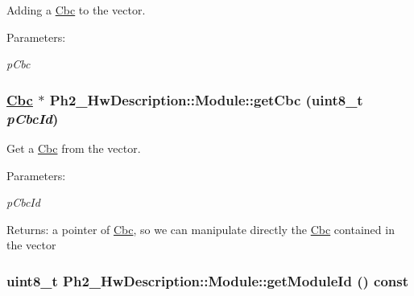 Adding a \hyperlink{class_ph2___hw_description_1_1_cbc}{Cbc} to the vector. 

\begin{Desc}
\item[Parameters:]
\begin{description}
\item[{\em p\-Cbc}]\end{description}
\end{Desc}
\hypertarget{class_ph2___hw_description_1_1_module_05ccbee9ca3eb8022e359b5e9dabe783}{
\subsubsection[getCbc]{\setlength{\rightskip}{0pt plus 5cm}\hyperlink{class_ph2___hw_description_1_1_cbc}{Cbc} $\ast$ Ph2\_\-Hw\-Description::Module::get\-Cbc (uint8\_\-t {\em p\-Cbc\-Id})}}
\label{class_ph2___hw_description_1_1_module_05ccbee9ca3eb8022e359b5e9dabe783}


Get a \hyperlink{class_ph2___hw_description_1_1_cbc}{Cbc} from the vector. 

\begin{Desc}
\item[Parameters:]
\begin{description}
\item[{\em p\-Cbc\-Id}]\end{description}
\end{Desc}
\begin{Desc}
\item[Returns:]a pointer of \hyperlink{class_ph2___hw_description_1_1_cbc}{Cbc}, so we can manipulate directly the \hyperlink{class_ph2___hw_description_1_1_cbc}{Cbc} contained in the vector \end{Desc}
\hypertarget{class_ph2___hw_description_1_1_module_4f2cd43cc66506fa093c4635bbb412dd}{
\subsubsection[getModuleId]{\setlength{\rightskip}{0pt plus 5cm}uint8\_\-t Ph2\_\-Hw\-Description::Module::get\-Module\-Id () const}}
\label{class_ph2___hw_description_1_1_module_4f2cd43cc66506fa093c4635bbb412dd}


